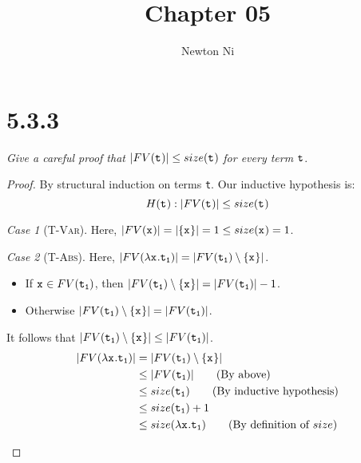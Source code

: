 \documentclass{article}
\title{Chapter 05}
\author{Newton Ni}
\newcommand{\term}[1]{\texttt{t\textsubscript{#1}}}
\newcommand{\var}[1]{\texttt{x\textsubscript{#1}}}
\theoremstyle{remark}
\newtheorem*{case}{Case}
\begin{document}
\maketitle

\section{5.3.3}

    \textit{Give a careful proof that} $|FV(\term{})| \le size(\term{})$ \textit{for every term} $\term{}$.

    \begin{proof}
        By structural induction on terms \term{}. Our inductive hypothesis is:
        $$H(\term{}): |FV(\term{})| \le size(\term{})$$

        \begin{case}[\textsc{T-Var}]
            Here, $|FV(\var{})| = |\{\var{}\}| = 1 \le size(\var{}) = 1$.
        \end{case}

        \begin{case}[\textsc{T-Abs}]
            Here, $|FV(\lambda \var{}. \term{1})| = |FV(\term{1}) \setminus \{\var{}\}|$.
            \begin{itemize}
                \item If $\var{} \in FV(\term{1})$, then $|FV(\term{1}) \setminus \{\var{}\}| = |FV(\term{1})| - 1$.
                \item Otherwise $|FV(\term{1}) \setminus \{\var{}\}| = |FV(\term{1})|$.
            \end{itemize}
            It follows that $|FV(\term{1}) \setminus \{\var{}\}| \le |FV(\term{1})|$.
            \begin{align*}
                |FV(\lambda \var{}. \term{1})| &= |FV(\term{1}) \setminus \{\var{}\}| \\
                                               &\le |FV(\term{1})| \tag{By above} \\
                                               &\le size(\term{1}) \tag{By inductive hypothesis} \\
                                               &\le size(\term{1}) + 1 \\
                                               &\le size(\lambda \var{}. \term{1}) \tag{By definition of $size$}
            \end{align*}
        \end{case}


\end{proof}
\end{document}
